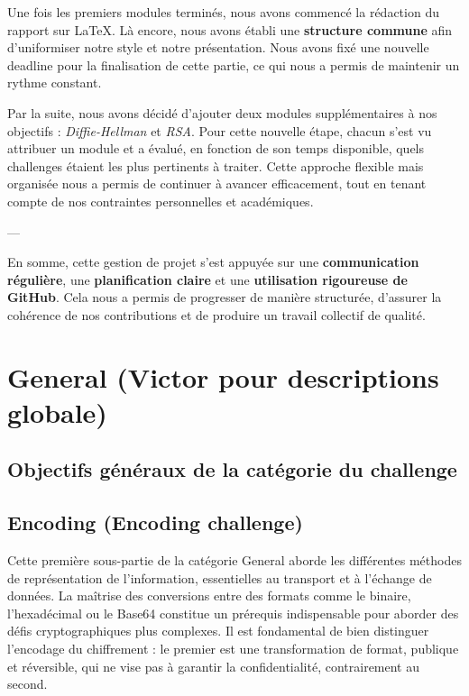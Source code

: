 \documentclass[12pt, a4paper]{article}
\begin{document}
    Une fois les premiers modules terminés, nous avons commencé la rédaction du rapport sur \LaTeX{}. Là encore, nous avons établi une \textbf{structure commune} afin d’uniformiser notre style et notre présentation. Nous avons fixé une nouvelle deadline pour la finalisation de cette partie, ce qui nous a permis de maintenir un rythme constant.

    Par la suite, nous avons décidé d’ajouter deux modules supplémentaires à nos objectifs : \textit{Diffie-Hellman} et \textit{RSA}. Pour cette nouvelle étape, chacun s’est vu attribuer un module et a évalué, en fonction de son temps disponible, quels challenges étaient les plus pertinents à traiter.  
    Cette approche flexible mais organisée nous a permis de continuer à avancer efficacement, tout en tenant compte de nos contraintes personnelles et académiques.

    ---

    En somme, cette gestion de projet s’est appuyée sur une \textbf{communication régulière}, une \textbf{planification claire} et une \textbf{utilisation rigoureuse de GitHub}. Cela nous a permis de progresser de manière structurée, d’assurer la cohérence de nos contributions et de produire un travail collectif de qualité.

\section{General (Victor pour descriptions globale)}
    \subsection{Objectifs généraux de la catégorie du challenge}
    
    \subsection{Encoding (Encoding challenge)}
    
        Cette première sous-partie de la catégorie General aborde les différentes méthodes de représentation de l'information, essentielles au transport et à l'échange de données. La maîtrise des conversions entre des formats comme le binaire, l'hexadécimal ou le Base64 constitue un prérequis indispensable pour aborder des défis cryptographiques plus complexes. Il est fondamental de bien distinguer l'encodage du chiffrement : le premier est une transformation de format, publique et réversible, qui ne vise pas à garantir la confidentialité, contrairement au second.
\end{document}
